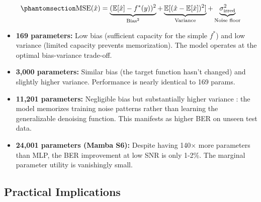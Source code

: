 \begin{equation}\protect\phantomsection\label{eq:bias-variance-relay}{\text{MSE}(\hat{x}) = \underbrace{(\mathbb{E}[\hat{x}] - f^*(y))^2}_{\text{Bias}^2} + \underbrace{\mathbb{E}[(\hat{x} - \mathbb{E}[\hat{x}])^2]}_{\text{Variance}} + \underbrace{\sigma^2_{\text{irred}}}_{\text{Noise floor}}
}\end{equation}

\begin{itemize}
\tightlist
\item
  \textbf{169 parameters:} Low bias (sufficient capacity for the simple \(f^*\)) and low variance (limited capacity prevents memorization). The model operates at the optimal bias-variance trade-off.
\item
  \textbf{3,000 parameters:} Similar bias (the target function hasn't changed) and slightly higher variance. Performance is nearly identical to 169 params.
\item
  \textbf{11,201 parameters:} Negligible bias but substantially higher variance : the model memorizes training noise patterns rather than learning the generalizable denoising function. This manifests as higher BER on unseen test data.
\item
  \textbf{24,001 parameters (Mamba S6):} Despite having 140× more parameters than MLP, the BER improvement at low SNR is only 1-2\%. The marginal parameter utility is vanishingly small.
\end{itemize}

\subsection{Practical Implications}\label{sec:practical-implications}

